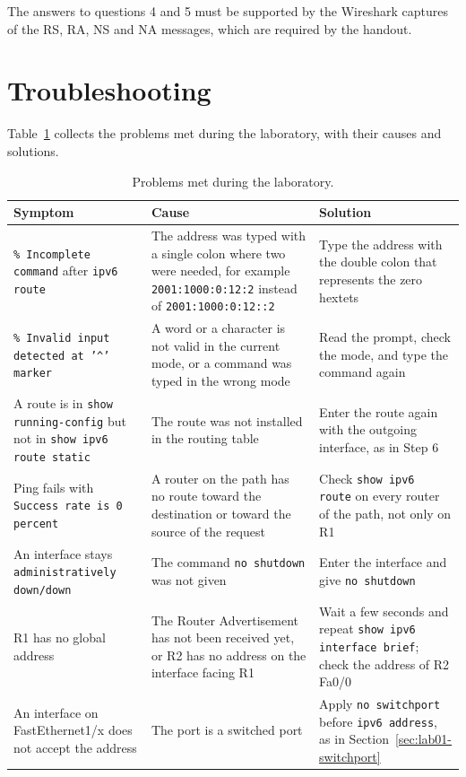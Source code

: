 The answers to questions 4 and 5 must be supported by the Wireshark captures of the RS, RA, NS and NA messages, which are required by the handout.

\section{Troubleshooting}

Table~\ref{tab:lab01-trouble} collects the problems met during the laboratory, with their causes and solutions.

\begin{table}[h]
\centering
\begin{tabular}{@{}p{4.3cm}p{5.4cm}p{5.6cm}@{}}
\toprule
\textbf{Symptom} & \textbf{Cause} & \textbf{Solution} \\
\midrule
\texttt{\% Incomplete command} after \texttt{ipv6 route} & The address was typed with a single colon where two were needed, for example \texttt{2001:1000:0:12:2} instead of \texttt{2001:1000:0:12::2} & Type the address with the double colon that represents the zero hextets \\
\midrule
\texttt{\% Invalid input detected at '\^{}' marker} & A word or a character is not valid in the current mode, or a command was typed in the wrong mode & Read the prompt, check the mode, and type the command again \\
\midrule
A route is in \texttt{show running-config} but not in \texttt{show ipv6 route static} & The route was not installed in the routing table & Enter the route again with the outgoing interface, as in Step 6 \\
\midrule
Ping fails with \texttt{Success rate is 0 percent} & A router on the path has no route toward the destination or toward the source of the request & Check \texttt{show ipv6 route} on every router of the path, not only on R1 \\
\midrule
An interface stays \texttt{administratively down/down} & The command \texttt{no shutdown} was not given & Enter the interface and give \texttt{no shutdown} \\
\midrule
R1 has no global address & The Router Advertisement has not been received yet, or R2 has no address on the interface facing R1 & Wait a few seconds and repeat \texttt{show ipv6 interface brief}; check the address of R2 Fa0/0 \\
\midrule
An interface on FastEthernet1/x does not accept the address & The port is a switched port & Apply \texttt{no switchport} before \texttt{ipv6 address}, as in Section~\ref{sec:lab01-switchport} \\
\bottomrule
\end{tabular}
\caption{Problems met during the laboratory.}
\label{tab:lab01-trouble}
\end{table}

